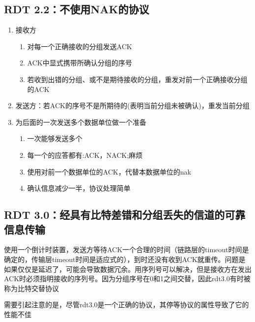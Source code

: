 \documentclass[]{report}
\begin{document}
		\subsection{RDT 2.2：不使用NAK的协议}
			\begin{enumerate}
				\item 接收方
				\begin{enumerate}
					\item 对每一个正确接收的分组发送ACK
					\item ACK中显式携带所确认分组的序号
					\item 若收到出错的分组、或不是期待接收的分组，重发对前一个正确接收分组的ACK
				\end{enumerate}
				\item 发送方：若ACK的序号不是所期待的(表明当前分组未被确认)，重发当前分组
				\item 为后面的一次发送多个数据单位做一个准备
				\begin{enumerate}
					\item 一次能够发送多个
					\item 每一个的应答都有:ACK，NACK;麻烦
					\item 使用对前一个数据单位的ACK，代替本数据单位的nak
					\item 确认信息减少一半，协议处理简单
				\end{enumerate}
			\end{enumerate}
		\subsection{RDT 3.0：经具有比特差错和分组丢失的信道的可靠信息传输}
			使用一个倒计时装置，发送方等待ACK一个合理的时间（链路层的timeout时间是确定的，传输层timeout时间是适应式的），到时还没有收到ACK就重传。问题是如果仅仅是延迟了，可能会导致数据冗余。用序列号可以解决，但是接收方在发出ACK时必须指明接收的序列号。因为分组序号在0和1之间交替，因此rdt3.0有时被称为比特交替协议\par
			需要引起注意的是，尽管rdt3.0是一个正确的协议，其停等协议的属性导致了它的性能不佳
\end{document}
